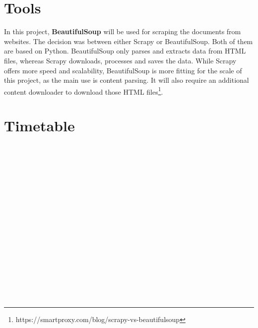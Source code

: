 \documentclass[11pt]{article}
\begin{document}
\section{Tools}
In this project, \textbf{BeautifulSoup} will be used for scraping the documents from websites. The decision was between either Scrapy or BeautifulSoup. Both of them are based on Python. BeautifulSoup only parses and extracts data from HTML files, whereas Scrapy downloads, processes and saves the data. While Scrapy offers more speed and scalability, BeautifulSoup is more fitting for the scale of this project, as the main use is content parsing. It will also require an additional content downloader to download those HTML files\footnote{https://smartproxy.com/blog/scrapy-vs-beautifulsoup}.

\section{Timetable}
\begin{ganttchart}[vgrid]{1}{16}
	 \\
	 \\
	 \\
	 \\
	 \\
	 \\
	 \\
	 \\
	 \\
	 \\
	 \\
	 \\
	 \\
	 \\
	 \\
	 \\
\end{ganttchart}




\end{document}
